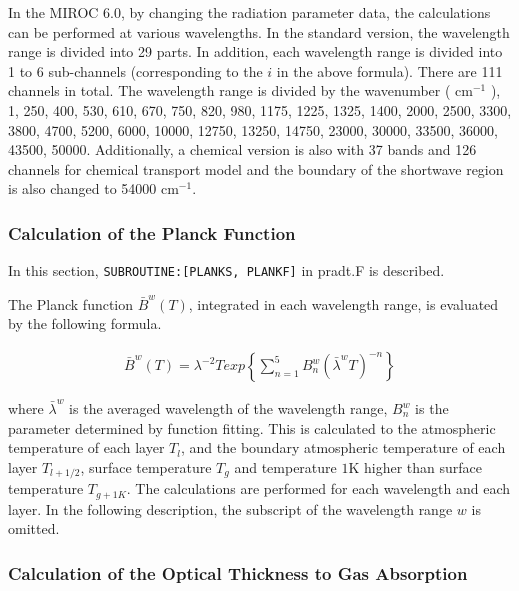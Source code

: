 In the MIROC 6.0, by changing the radiation parameter data, the calculations can be performed at various wavelengths. In the standard version, the wavelength range is divided into 29 parts. In
addition, each wavelength range is divided into 1 to 6 sub-channels (corresponding to the \(i\) in the above formula). There are 111 channels in total. The wavelength range is divided by the
wavenumber ( \(\mathrm{cm}^{-1}\) ), 1, 250, 400, 530, 610, 670, 750, 820, 980, 1175, 1225, 1325, 1400, 2000, 2500, 3300, 3800, 4700, 5200, 6000, 10000, 12750, 13250, 14750, 23000, 30000, 33500,
36000, 43500, 50000. Additionally, a chemical version is also with 37 bands and 126 channels for chemical transport model and the boundary of the shortwave region is also changed to 54000
\(\mathrm{cm}^{-1}\).

\hypertarget{calculation-of-the-planck-function}{%
\subsubsection{Calculation of the Planck Function}\label{calculation-of-the-planck-function}}

In this section, \texttt{SUBROUTINE:{[}PLANKS,\ PLANKF{]}} in pradt.F is described.

The Planck function \(\bar{B}^{w}(T)\), integrated in each wavelength range, is evaluated by the following formula.

\begin{eqnarray}
\bar{B}^{w}(T)=\lambda^{-2}{Texp}\left\{\sum_{n=1}^{5} B_{n}^{w}\left(\bar{\lambda}^{w} T\right)^{-n}\right\}
\end{eqnarray}

where \(\bar{\lambda}^{w}\) is the averaged wavelength of the wavelength range, \(B_{n}^{w}\) is the parameter determined by function fitting. This is calculated to the atmospheric temperature of each
layer \(T_l\), and the boundary atmospheric temperature of each layer \(T_{l+1/2}\), surface temperature \(T_g\) and temperature \(1\mathrm{K}\) higher than surface temperature \(T_{g+1K}\). The
calculations are performed for each wavelength and each layer. In the following description, the subscript of the wavelength range \(w\) is omitted.

\hypertarget{calculation-of-the-optical-thickness-to-gas-absorption}{%
\subsubsection{Calculation of the Optical Thickness to Gas Absorption}\label{calculation-of-the-optical-thickness-to-gas-absorption}}

